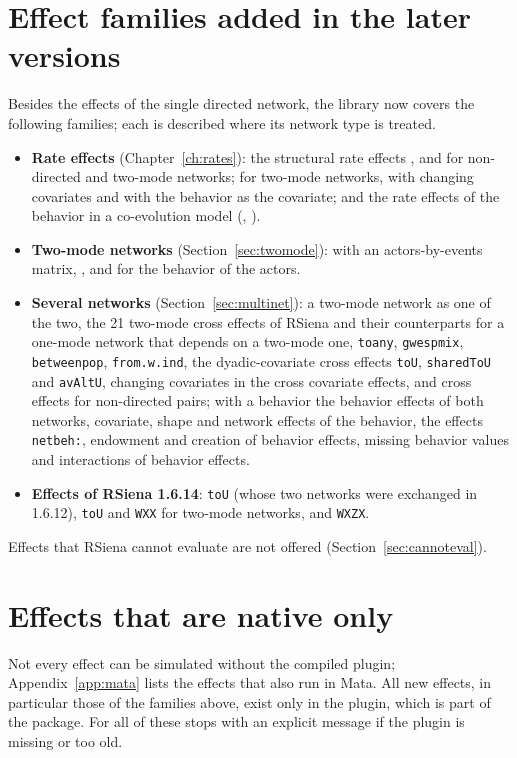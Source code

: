\section{Effect families added in the later versions}
Besides the effects of the single directed network, the library now covers the following families; each is described where its network type is treated.
\begin{itemize}[nosep]
\item \textbf{Rate effects} (Chapter~\ref{ch:rates}): the structural rate effects ,  and  for non-directed and two-mode networks;  for two-mode networks, with changing covariates and with the behavior as the covariate; and the rate effects of the behavior in a co-evolution model (, ).
\item \textbf{Two-mode networks} (Section~\ref{sec:twomode}):  with an actors-by-events matrix, , and  for the behavior of the actors.
\item \textbf{Several networks} (Section~\ref{sec:multinet}): a two-mode network as one of the two, the 21 two-mode cross effects of RSiena and their counterparts for a one-mode network that depends on a two-mode one, \texttt{toany}, \texttt{gwespmix}, \texttt{betweenpop}, \texttt{from.w.ind}, the dyadic-covariate cross effects \texttt{toU}, \texttt{sharedToU} and \texttt{avAltU}, changing covariates in the cross covariate effects, and cross effects for non-directed pairs; with a behavior the behavior effects of both networks, covariate, shape and network effects of the behavior, the effects \texttt{netbeh:}, endowment and creation of behavior effects, missing behavior values and interactions of behavior effects.
\item \textbf{Effects of RSiena 1.6.14}: \texttt{toU} (whose two networks were exchanged in 1.6.12), \texttt{toU} and \texttt{WXX} for two-mode networks, and \texttt{WXZX}.
\end{itemize}
Effects that RSiena cannot evaluate are not offered (Section~\ref{sec:cannoteval}).

\section{Effects that are native only}
Not every effect can be simulated without the compiled plugin; Appendix~\ref{app:mata} lists the effects that also run in Mata. All new effects, in particular those of the families above, exist only in the plugin, which is part of the package. For all of these \nwsaom{} stops with an explicit message if the plugin is missing or too old.
